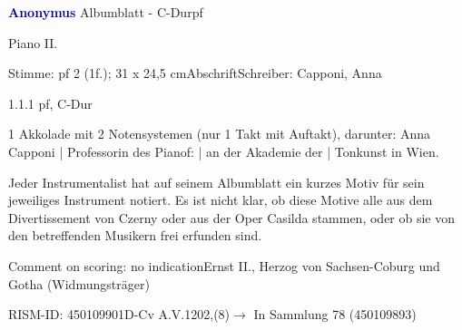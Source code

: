 \documentclass[a4paper, twocolumn, 11pt]{book}
\begin{document}
\par \vspace{16pt} \textcolor{darkblue}{\textbf{Anonymus  }}\hfillplus{[6]}\newline Albumblatt - C-Dur\newline pf
\par \begin{itshape}[heading:] Piano II.\end{itshape} 
\par \textcolor{darkblue}{}  Stimme: pf 2  (1f.); 31 x 24,5 cm\newline Abschrift\newline Schreiber: Capponi, Anna
\par 1.1.1  pf, C-Dur  
\begin{filecontents*}{6-1.code}
@clef:G-2
@keysig:
@timesig:c
@data:''(8{CDE})/({FFG})({AB'''C})({D''B'''C})({DbEnE}})/
\end{filecontents*}
\newline %
\par 1 Akkolade mit 2 Notensystemen (nur 1 Takt mit Auftakt), darunter: Anna Capponi | Professorin des Pianof: | an der Akademie der | Tonkunst in Wien.
\par Jeder Instrumentalist hat auf seinem Albumblatt ein kurzes Motiv für sein jeweiliges Instrument notiert. Es ist nicht klar, ob diese Motive alle aus dem {\textquotedbl}Divertissement{\textquotedbl} von Czerny oder aus der Oper {\textquotedbl}Casilda{\textquotedbl} stammen, oder ob sie von den betreffenden Musikern frei erfunden sind.
\par Comment on scoring: no indication\newline Ernst II., Herzog von Sachsen-Coburg und Gotha  (Widmungsträger)
\par RISM-ID: 450109901\newline D-Cv  A.V.1202,(8)\newline $\rightarrow$ In Sammlung 78 (450109893)
      
\end{document}
